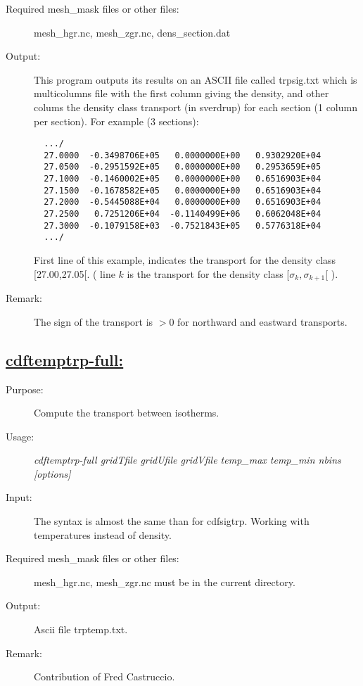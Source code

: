 \documentclass[a4paper,11pt]{article}
\begin{document}
\begin{description}
\item[Required mesh\_mask files or other files:]   mesh\_hgr.nc, mesh\_zgr.nc, dens\_section.dat
\item[Output:] This program outputs its results on  an ASCII file called trpsig.txt which is multicolumns file with the first column
giving the density, and other colums the density class transport (in sverdrup) for each section (1 column per section). For example (3 sections):
\begin{scriptsize}
\begin{verbatim}
  .../
  27.0000  -0.3498706E+05   0.0000000E+00   0.9302920E+04
  27.0500  -0.2951592E+05   0.0000000E+00   0.2953659E+05
  27.1000  -0.1460002E+05   0.0000000E+00   0.6516903E+04
  27.1500  -0.1678582E+05   0.0000000E+00   0.6516903E+04
  27.2000  -0.5445088E+04   0.0000000E+00   0.6516903E+04
  27.2500   0.7251206E+04  -0.1140499E+06   0.6062048E+04
  27.3000  -0.1079158E+03  -0.7521843E+05   0.5776318E+04
  .../
\end{verbatim}
\end{scriptsize}
First line of this example, indicates the transport for the density class [27.00,27.05[. ( line $k$ is the transport for the density class
[$\sigma_k, \sigma_{k+1}$[ ).

\item[Remark:]  The sign of the transport is $>0$ for northward and eastward transports.
\end{description}

\newpage
\subsection*{\underline{cdftemptrp-full:}}
\begin{description}
\item[Purpose:] Compute the transport between isotherms.
\item[Usage:] {\em cdftemptrp-full gridTfile  gridUfile gridVfile   temp\_max temp\_min nbins [options] }
\item[Input:]  The syntax is almost the same than for cdfsigtrp. Working with temperatures instead of density.
\item[Required mesh\_mask files or other files:] mesh\_hgr.nc, mesh\_zgr.nc must be in the current directory.
\item[Output:] Ascii file trptemp.txt.
\item[Remark:]  Contribution of Fred Castruccio.
\end{description}
\end{document}
